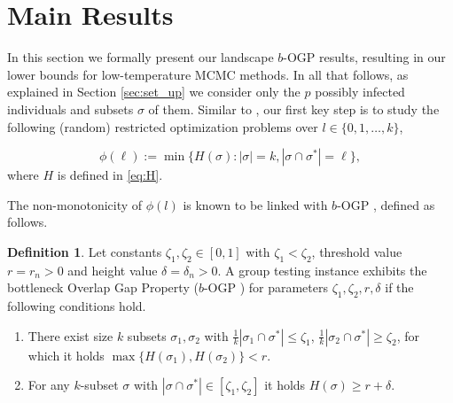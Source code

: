 \documentclass[12pt,reqno]{amsart}
\numberwithin{equation}{section}
\theoremstyle{definition}
\newtheorem{definition}[theorem]{Definition}
\renewcommand{\[}{\begin{equation}}
\renewcommand{\]}{\end{equation}}
\renewcommand{\|}{\bigg{|}}
\newcommand{\range}[1]{\ensuremath{\{0,1,\dots, #1\}}}
\newcommand{\bogp}{$b$-OGP }
\begin{document}

\section{Main Results}
In this section we formally present our landscape \bogp results, resulting in our lower bounds for low-temperature MCMC methods. In all that follows, as explained in Section \ref{sec:set_up} we consider only the $p$ possibly infected individuals and subsets $\sigma$ of them.  Similar to \cite{iliopoulos2021group}, our first key step is to study the following (random) restricted optimization problems over $l \in \range{k}$,

\[\phi(\ell):= \min \{ H(\sigma): |\sigma|=k, |\sigma \cap \sigma^*|=\ell\}\label{eq:phil},\]where $H$ is defined in \eqref{eq:H}. 

The non-monotonicity of $\phi(l)$ is known to be linked with \bogp \cite{gamarnik2022sparse}, defined as follows.

\begin{definition}\label{def:OGP}
    Let constants $\zeta_1, \zeta_2 \in [0,1]$ with $\zeta_1 < \zeta_2$, threshold value $r=r_n> 0$ and height value $\delta=\delta_n > 0$. A group testing instance exhibits the bottleneck Overlap Gap Property (\bogp) for parameters $\zeta_1, \zeta_2, r, \delta$ if the following conditions hold.
    \begin{enumerate} 
        \item There exist size $k$ subsets $\sigma_1,\sigma_2$ with $\frac{1}{k}|\sigma_1 \cap \sigma^*| \leq \zeta_1$, $\frac{1}{k}|\sigma_2 \cap \sigma^*| \geq \zeta_2$, for which it holds $\max\{ H(\sigma_1), H(\sigma_2)\} < r.$
        
        \item For any $k$-subset $\sigma$ with $|\sigma \cap \sigma^*| \in [\zeta_1, \zeta_2]$ it holds $H(\sigma) \geq r + \delta$.
    \end{enumerate}
\end{definition}


    
\end{document}
